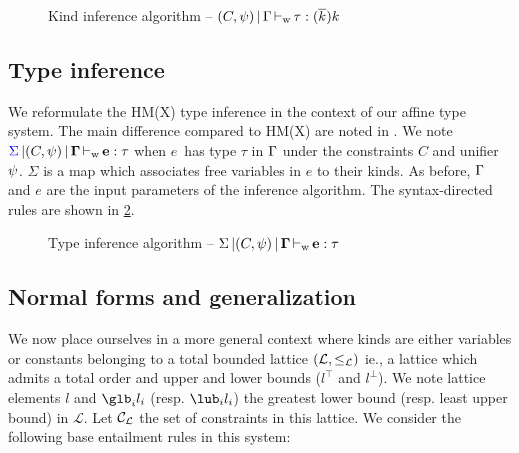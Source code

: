\begin{figure}[ht]
  \centering
  
  \caption{Kind inference algorithm -- $(C,\mathrm{\psi}) \operatorname{|} \Gamma \operatorname{\vdash_w} \tau : (\overline{k_{{}}}) k$}
  \label{rules:kinding}
\end{figure}



\subsection{Type inference}

We reformulate the HM(X) type inference in the context of our affine type
system. The main difference compared to HM(X) are noted in .
We note ${\color{blue}{\Sigma}} \operatorname{|} (C,\mathrm{\psi}) \operatorname{|} \bf{\Gamma} \operatorname{\vdash_w} \bf{e} : \tau$ when
$e$\ has type $\tau$ in $\Gamma$ under the constraints $C$ and unifier $\mathrm{\psi}$.
$\Sigma$ is a map which associates free variables in $e$ to
their kinds.
As before, $\Gamma$ and $e$ are the input parameters of the inference
algorithm. The syntax-directed rules are shown in \cref{rules:typing}.

\begin{figure*}[htp]
  
  \caption{Type inference algorithm -- $\Sigma \operatorname{|} (C,\psi) \operatorname{|} \bf{\Gamma} \operatorname{\vdash_w} \bf{e} : \tau$ }
  \label{rules:typing}
\end{figure*}

\subsection{Normal forms and generalization}
\label{sec:normalize}


We now place ourselves in a more general context where kinds are either variables
or constants belonging to a total bounded lattice $(\mathcal L, \leq_\mathcal L)$ ie.,
a lattice which admits a total order and upper and lower bounds ($l^\top$ and $l^\bot$).
We note lattice elements $l$ and $\glb_i l_i$ (resp. $\lub_i l_i$)
the greatest lower bound (resp. least upper bound) in $\mathcal L$.
%
Let ${\mathcal C_{\mathcal L}}$ the set of constraints in this lattice. We consider the
following base entailment rules in this system:
\begin{center}
\end{center}




